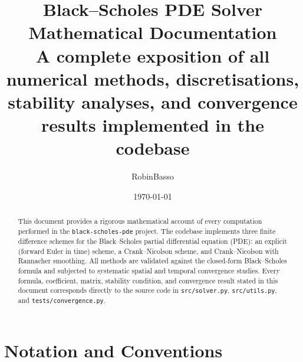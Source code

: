 \documentclass[12pt, a4paper]{article}
\title{
    \vspace{-1cm}
    \textbf{\Large Black--Scholes PDE Solver} \\[0.4em]
    \large Mathematical Documentation \\[0.2em]
    \normalsize A complete exposition of all numerical methods, discretisations,
    stability analyses, and convergence results implemented in the codebase
}
\author{RobinBasso}
\date{\today}
\begin{document}

\maketitle
\thispagestyle{fancy}

\begin{abstract}
This document provides a rigorous mathematical account of every computation
performed in the \texttt{black-scholes-pde} project. The codebase implements
three finite difference schemes for the Black--Scholes partial differential
equation (PDE): an explicit (forward Euler in time) scheme, a
Crank--Nicolson scheme, and Crank--Nicolson with Rannacher smoothing. All
methods are validated against the closed-form Black--Scholes formula and
subjected to systematic spatial and temporal convergence studies. Every
formula, coefficient, matrix, stability condition, and convergence result
stated in this document corresponds directly to the source code in
\texttt{src/solver.py}, \texttt{src/utils.py}, and \texttt{tests/convergence.py}.
\end{abstract}

\tableofcontents
\newpage

\section{Notation and Conventions}
\end{document}
